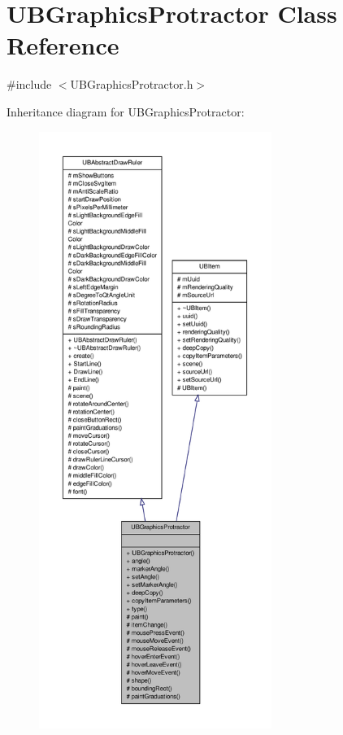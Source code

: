 \hypertarget{class_u_b_graphics_protractor}{\section{U\-B\-Graphics\-Protractor Class Reference}
\label{d5/d69/class_u_b_graphics_protractor}
}


{\ttfamily \#include $<$U\-B\-Graphics\-Protractor.\-h$>$}



Inheritance diagram for U\-B\-Graphics\-Protractor\-:
\nopagebreak
\begin{figure}[H]
\begin{center}
\leavevmode
\includegraphics[height=550pt]{dd/d41/class_u_b_graphics_protractor__inherit__graph}
\end{center}
\end{figure}


